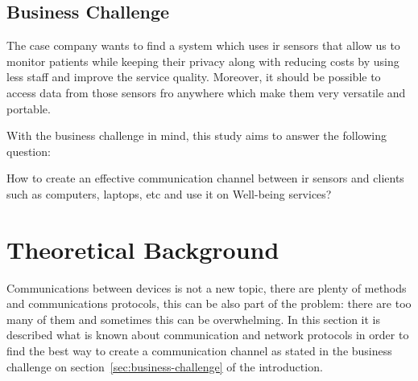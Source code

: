 \documentclass[hidelinks,11pt,a4paper,oneside,article]{memoir}
\begin{document}
\section*{Business Challenge}\label{sec:business-challenge}
The case company wants to find a system which uses \gls{ir} sensors that allow us to monitor patients while keeping their privacy along with reducing costs by using less staff and improve the service quality. Moreover, it should be possible to access data from those sensors fro anywhere which make them very versatile and portable.

With the business challenge in mind, this study aims to answer the following question:
\begin{displayquote}
{ How to create an effective communication channel between \gls{ir} sensors and clients such as computers, laptops, etc and use it on Well-being services?}
\end{displayquote}




\clearpage\chapter{Theoretical Background}\label{sec:theoretical-background}

Communications between devices is not a new topic, there are plenty of methods and communications protocols, this can be also part of the problem: there are too many of them and sometimes this can be overwhelming. In this section it is described what is known about communication and network protocols in order to find the best way to create a communication channel as stated in the business challenge on section~\ref{sec:business-challenge} of the introduction.
\end{document}
